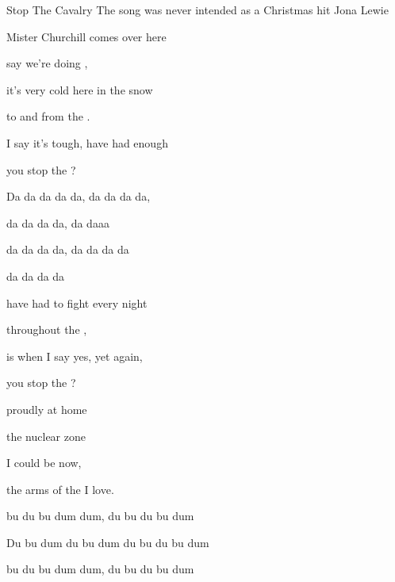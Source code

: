 \begin{SBSong}{Stop The Cavalry}
    {The song was never intended as a Christmas hit}
    {Jona Lewie}
  \begin{SBVerse}
     Mister Churchill  comes over here
    
     say we're doing ,
    
     it's very cold  here in the snow
    
     to and from the .
    
     I say it's tough,  have had enough
    
     you stop the ? 
  \end{SBVerse}
  \begin{SBVerse}
    Da da da da da,  da da da da,
    
     da da da da,  da daaa
    
     da da da da,  da da da da
    
     da da da  da 
  \end{SBVerse}
  \begin{SBVerse}
     have had to fight  every night
    
     throughout the ,
    
     is when I say  yes, yet again,
    
     you stop the ? 
  \end{SBVerse}
  \begin{SBVerse}
     proudly  at home
    
     the nuclear  zone
    
     I could be  now,
    
     the arms of the  I love.
  \end{SBVerse}
  \begin{SBVerse}
     bu du bu dum dum, du bu du bu dum
    
    Du bu  dum du bu dum du bu du bu dum
    
     bu du bu dum dum, du bu du bu dum
    

\end{SBVerse}
\end{SBSong}
